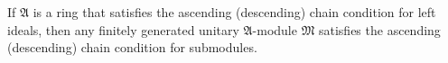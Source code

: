 If $\mathfrak{A}$ is a ring that satisfies the ascending (descending) chain condition for left ideals, then any finitely generated unitary $\mathfrak{A}$-module $\mathfrak{M}$ satisfies the ascending (descending) chain condition for submodules.

